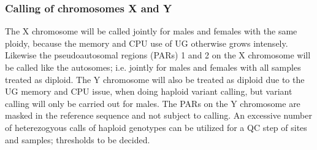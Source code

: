 \subsubsection{Calling of chromosomes X and Y}
The X chromosome will be called jointly for males and females with the same ploidy, because the memory and CPU use of UG otherwise grows intensely. Likewise the pseudoautosomal regions (PARs) 1 and 2 on the X chromosome will be called like the autosomes; i.e. jointly for males and females with all samples treated as diploid. The Y chromosome will also be treated as diploid due to the UG memory and CPU issue, when doing haploid variant calling, but variant calling will only be carried out for males. The PARs on the Y chromosome are masked in the reference sequence and not subject to calling. An excessive number of heterezogyous calls of haploid genotypes can be utilized for a QC step of sites and samples; thresholds to be decided.

%
